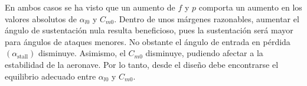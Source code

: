 En ambos casos se ha visto que un aumento de $f$ y $p$ comporta un aumento en los valores absolutos de $\alpha_{l0}$ y $C_{m0}$. Dentro de unos márgenes razonables, aumentar el ángulo de sustentación nula resulta beneficioso, pues la sustentación será mayor para ángulos de ataques menores. No obstante el ángulo de entrada en pérdida $\left( \alpha_\text{stall} \right)$ disminuye. Asimismo, el $C_{m0}$ disminuye, pudiendo afectar a la estabilidad de la aeronave. Por lo tanto, desde el diseño debe encontrarse el equilibrio adecuado entre $\alpha_{l0}$ y $C_{m0}$.
